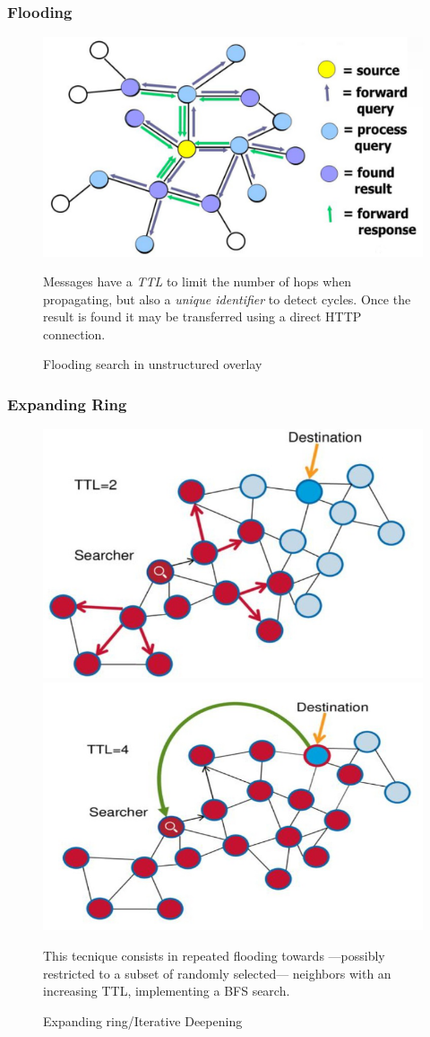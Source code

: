 \subsubsection{Flooding}
\begin{figure}[htbp]
   \centering
   \includegraphics{images/flooding_unstructured.png}
   \caption{Flooding search in unstructured overlay}
   Messages have a \textit{TTL} to limit the number of hops when propagating, but also a \textit{unique identifier} to detect cycles.
   Once the result is found it may be transferred using a direct HTTP connection.

   \label{fig:flooding_unstructured}
\end{figure}

\newpage
\subsubsection{Expanding Ring}
\begin{figure}[htbp]
   \centering
   \includegraphics[width=0.45\columnwidth]{images/expandingring2.png}
   \includegraphics[width=0.45\columnwidth]{images/expandingring4.png}
   \caption{Expanding ring/Iterative Deepening}
   This tecnique consists in repeated flooding towards ---possibly restricted to a subset of randomly selected--- neighbors with an increasing TTL, implementing a BFS search.
   \label{fig:expandingring}
\end{figure}

